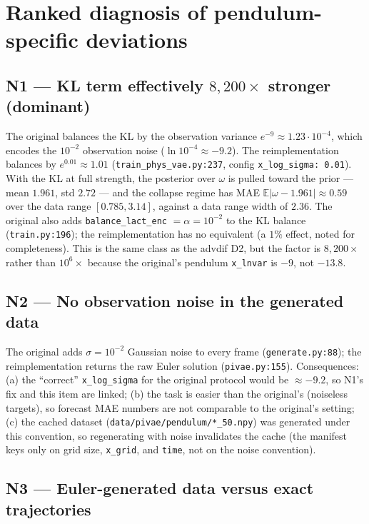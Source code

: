 \documentclass[11pt,a4paper]{article}
\newcommand{\code}[1]{\texttt{#1}}
\begin{document}
\section{Ranked diagnosis of pendulum-specific deviations}
\label{sec:diagnosis}

\subsection*{N1 --- KL term effectively $8{,}200\times$ stronger (dominant)}

The original balances the KL by the observation variance $e^{-9} \approx 1.23
\cdot 10^{-4}$, which encodes the $10^{-2}$ observation noise ($\ln 10^{-4}
\approx -9.2$). The reimplementation balances by $e^{0.01} \approx 1.01$
(\code{train\_phys\_vae.py:237}, config \code{x\_log\_sigma: 0.01}). With the
KL at full strength, the posterior over $\omega$ is pulled toward the prior
--- mean $1.961$, std $2.72$ --- and the collapse regime has MAE
$\mathbb{E}|\omega - 1.961| \approx 0.59$ over the data range $[0.785, 3.14]$,
against a data range width of $2.36$. The original also adds
\code{balance\_lact\_enc} $= \alpha = 10^{-2}$ to the KL balance
(\code{train.py:196}); the reimplementation has no equivalent (a $1\%$ effect,
noted for completeness). This is the same class as the advdif D2, but the
factor is $8{,}200\times$ rather than $10^6\times$ because the original's
pendulum \code{x\_lnvar} is $-9$, not $-13.8$.

\subsection*{N2 --- No observation noise in the generated data}

The original adds $\sigma = 10^{-2}$ Gaussian noise to every frame
(\code{generate.py:88}); the reimplementation returns the raw Euler solution
(\code{pivae.py:155}). Consequences: (a) the ``correct'' \code{x\_log\_sigma}
for the original protocol would be $\approx -9.2$, so N1's fix and this item
are linked; (b) the task is easier than the original's (noiseless targets),
so forecast MAE numbers are not comparable to the original's setting; (c) the
cached dataset (\code{data/pivae/pendulum/*\_50.npy}) was generated under this
convention, so regenerating with noise invalidates the cache (the manifest
keys only on grid size, \code{x\_grid}, and \code{time}, not on the noise
convention).

\subsection*{N3 --- Euler-generated data versus exact trajectories}
\end{document}
